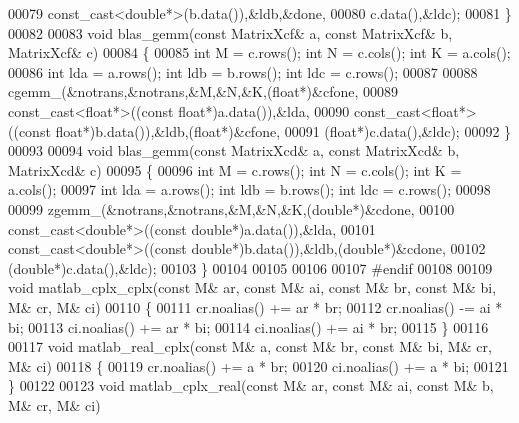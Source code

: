 \begin{DoxyCode}
00079          const\_cast<double*>(b.data()),&ldb,&done,
00080          c.data(),&ldc);
00081 \}
00082 
00083 \textcolor{keywordtype}{void} blas\_gemm(\textcolor{keyword}{const} MatrixXcf& a, \textcolor{keyword}{const} MatrixXcf& b, MatrixXcf& c)
00084 \{
00085   \textcolor{keywordtype}{int} M = c.rows(); \textcolor{keywordtype}{int} N = c.cols(); \textcolor{keywordtype}{int} K = a.cols();
00086   \textcolor{keywordtype}{int} lda = a.rows(); \textcolor{keywordtype}{int} ldb = b.rows(); \textcolor{keywordtype}{int} ldc = c.rows();
00087 
00088   cgemm\_(&notrans,&notrans,&M,&N,&K,(\textcolor{keywordtype}{float}*)&cfone,
00089          const\_cast<float*>((\textcolor{keyword}{const} \textcolor{keywordtype}{float}*)a.data()),&lda,
00090          const\_cast<float*>((\textcolor{keyword}{const} \textcolor{keywordtype}{float}*)b.data()),&ldb,(\textcolor{keywordtype}{float}*)&cfone,
00091          (\textcolor{keywordtype}{float}*)c.data(),&ldc);
00092 \}
00093 
00094 \textcolor{keywordtype}{void} blas\_gemm(\textcolor{keyword}{const} MatrixXcd& a, \textcolor{keyword}{const} MatrixXcd& b, MatrixXcd& c)
00095 \{
00096   \textcolor{keywordtype}{int} M = c.rows(); \textcolor{keywordtype}{int} N = c.cols(); \textcolor{keywordtype}{int} K = a.cols();
00097   \textcolor{keywordtype}{int} lda = a.rows(); \textcolor{keywordtype}{int} ldb = b.rows(); \textcolor{keywordtype}{int} ldc = c.rows();
00098 
00099   zgemm\_(&notrans,&notrans,&M,&N,&K,(\textcolor{keywordtype}{double}*)&cdone,
00100          const\_cast<double*>((\textcolor{keyword}{const} \textcolor{keywordtype}{double}*)a.data()),&lda,
00101          const\_cast<double*>((\textcolor{keyword}{const} \textcolor{keywordtype}{double}*)b.data()),&ldb,(\textcolor{keywordtype}{double}*)&cdone,
00102          (\textcolor{keywordtype}{double}*)c.data(),&ldc);
00103 \}
00104 
00105 
00106 
00107 \textcolor{preprocessor}{#endif}
00108 
00109 \textcolor{keywordtype}{void} matlab\_cplx\_cplx(\textcolor{keyword}{const} M& ar, \textcolor{keyword}{const} M& ai, \textcolor{keyword}{const} M& br, \textcolor{keyword}{const} M& bi, M& cr, M& ci)
00110 \{
00111   cr.noalias() += ar * br;
00112   cr.noalias() -= ai * bi;
00113   ci.noalias() += ar * bi;
00114   ci.noalias() += ai * br;
00115 \}
00116 
00117 \textcolor{keywordtype}{void} matlab\_real\_cplx(\textcolor{keyword}{const} M& a, \textcolor{keyword}{const} M& br, \textcolor{keyword}{const} M& bi, M& cr, M& ci)
00118 \{
00119   cr.noalias() += a * br;
00120   ci.noalias() += a * bi;
00121 \}
00122 
00123 \textcolor{keywordtype}{void} matlab\_cplx\_real(\textcolor{keyword}{const} M& ar, \textcolor{keyword}{const} M& ai, \textcolor{keyword}{const} M& b, M& cr, M& ci)

\end{DoxyCode}
